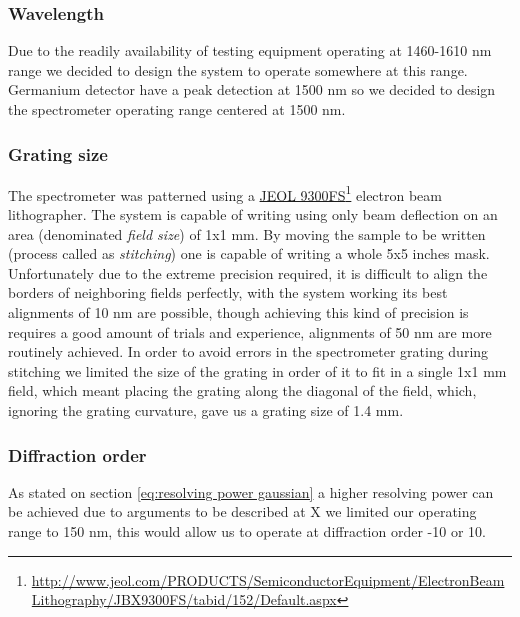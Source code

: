 \documentclass[12pt,twoside,english]{book}
\renewcommand{\~}{\perispomeni}%
\numberwithin{equation}{section}
\numberwithin{figure}{section}
\newcommand\fnurl[2]{%
 \href{#2}{#1}\footnote{\url{#2}}%
}
\begin{document}
\subsubsection{Wavelength}
Due to the readily availability of testing equipment operating at 1460-1610 nm range we decided to design the system to operate somewhere at this range. Germanium detector have a peak detection at 1500 nm so we decided to design the spectrometer operating range centered at 1500 nm.
\subsubsection{Grating size}
The spectrometer was patterned using a \fnurl{JEOL 9300FS}{http://www.jeol.com/PRODUCTS/SemiconductorEquipment/ElectronBeamLithography/JBX9300FS/tabid/152/Default.aspx} electron beam lithographer. The system is capable of writing using only beam deflection on an area (denominated \emph{field size}) of 1x1 mm. By moving the sample to be written (process called as \emph{stitching}) one is capable of writing a whole 5x5 inches mask. Unfortunately due to the extreme precision required, it is difficult to align the borders of neighboring fields perfectly, with the system working its best alignments of 10 nm are possible, though achieving this kind of precision is requires a good amount of trials and experience, alignments of 50 nm are more routinely achieved. In order to avoid errors in the spectrometer grating during stitching we limited the size of the grating in order of it to fit in a single 1x1 mm field, which meant placing the grating along the diagonal of the field, which, ignoring the grating curvature, gave us a grating size of 1.4 mm.

\subsubsection{Diffraction order}
As stated on section \ref{eq:resolving power gaussian} a higher resolving power can be achieved due to arguments to be described at X we limited our operating range to 150 nm, this would allow us to operate at diffraction order -10 or 10. 
\end{document}
